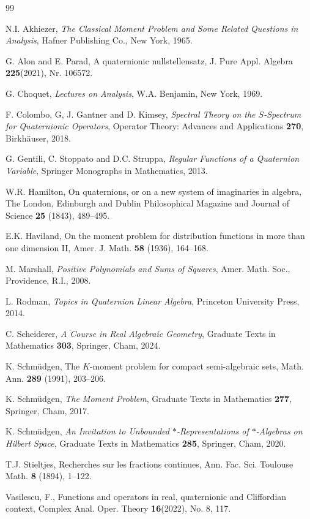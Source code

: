 \documentclass[11pt,a4paper]{amsart}
\theoremstyle{definition}
\begin{document}
\begin{thebibliography}{99}

 N.I. Akhiezer, \emph{The Classical Moment Problem and Some Related Questions in Analysis}, Hafner Publishing Co., New York, 1965.

 G. Alon and E. Parad, A quaternionic nullstellensatz, J. Pure Appl. Algebra \textbf{225}(2021), Nr. 106572.

 G. Choquet, \emph{Lectures on Analysis}, W.A. Benjamin, New York, 1969.

 F. Colombo, G, J. Gantner and D. Kimsey, \emph{Spectral Theory on the $S$-Spectrum for Quaternionic Operators}, Operator Theory: Advances and Applications \textbf{270}, Birkh\"auser, 2018.

 G. Gentili, C. Stoppato and D.C. Struppa, \emph{Regular Functions of a Quaternion Variable}, Springer Monographs in Mathematics, 2013.

 W.R. Hamilton, On quaternions, or on a new system of imaginaries in algebra, The London, Edinburgh and Dublin Philosophical Magazine and Journal of Science \textbf{25} (1843), 489--495.

 E.K. Haviland, On the moment problem for distribution functions in more than one dimension II, Amer. J. Math. \textbf{58} (1936), 164--168.

 M. Marshall, \emph{Positive Polynomials and Sums of Squares}, Amer. Math. Soc., Providence, R.I., 2008.

 L. Rodman, \emph{Topics in Quaternion Linear Algebra}, Princeton University Press, 2014.

 C. Scheiderer, \emph{A Course in Real Algebraic Geometry}, Graduate Texts in Mathematics \textbf{303}, Springer, Cham, 2024.

 K. Schm\"{u}dgen, The $K$-moment problem for compact semi-algebraic sets, Math. Ann. \textbf{289} (1991), 203--206.

 K. Schm\"{u}dgen, \emph{The Moment Problem}, Graduate Texts in Mathematics \textbf{277}, Springer, Cham, 2017.

 K. Schm\"{u}dgen, \emph{An Invitation to Unbounded $*$-Representations of $*$-Algebras on Hilbert Space}, Graduate Texts in Mathematics \textbf{285}, Springer, Cham, 2020.

 T.J. Stieltjes, Recherches sur les fractions continues, Ann. Fac. Sci. Toulouse Math. \textbf{8} (1894), 1--122.

 Vasilescu, F., Functions and operators in real, quaternionic and Cliffordian context, Complex Anal. Oper. Theory \textbf{16}(2022), No. 8, 117.
\end{thebibliography}
\end{document}
